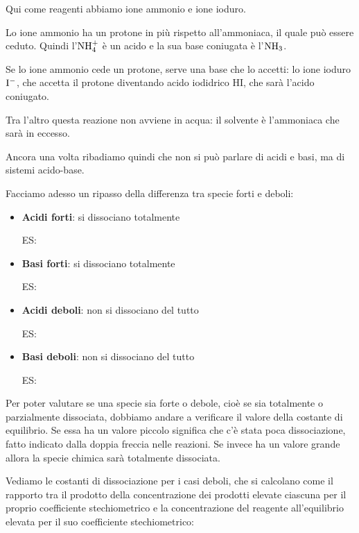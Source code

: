 \vspace{-0.18cm}Qui come reagenti abbiamo ione ammonio e ione ioduro.

Lo ione ammonio ha un protone in più rispetto all'ammoniaca, il quale può essere ceduto. Quindi l'$\rm NH_4^+$ è un acido e la sua base coniugata è l'$\rm NH_3$.

Se lo ione ammonio cede un protone, serve una base che lo accetti: lo ione ioduro $\rm I^-$, che accetta il protone diventando acido iodidrico HI, che sarà l'acido coniugato.

Tra l'altro questa reazione non avviene in acqua: il solvente è l'ammoniaca che sarà in eccesso.

Ancora una volta ribadiamo quindi che non si può parlare di acidi e basi, ma di sistemi acido-base.

\vspace{0.2cm}Facciamo adesso un ripasso della differenza tra specie forti e deboli:

\begin{itemize}
    \item \textbf{Acidi forti}: si dissociano totalmente
    
    ES: 
    \item \textbf{Basi forti}: si dissociano totalmente
    
    ES: 
    \item \textbf{Acidi deboli}: non si dissociano del tutto
    
    ES: 
    \item \textbf{Basi deboli}: non si dissociano del tutto
    
    ES: 
\end{itemize}

Per poter valutare se una specie sia forte o debole, cioè se sia totalmente o parzialmente dissociata, dobbiamo andare a verificare il valore della costante di equilibrio. Se essa ha un valore piccolo significa che c'è stata poca dissociazione, fatto indicato dalla doppia freccia nelle reazioni. Se invece ha un valore grande allora la specie chimica sarà totalmente dissociata.

\vspace{0.2cm}Vediamo le costanti di dissociazione per i casi deboli, che si calcolano come il rapporto tra il prodotto della concentrazione dei prodotti elevate ciascuna per il proprio coefficiente stechiometrico e la concentrazione del reagente all'equilibrio elevata per il suo coefficiente stechiometrico:

